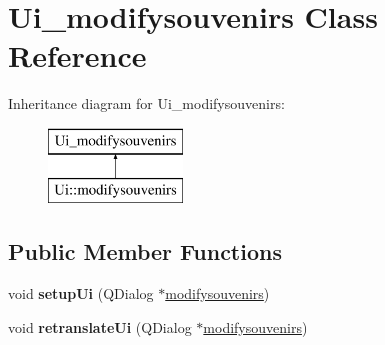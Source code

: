 \hypertarget{class_ui__modifysouvenirs}{}\section{Ui\+\_\+modifysouvenirs Class Reference}
\label{class_ui__modifysouvenirs}
Inheritance diagram for Ui\+\_\+modifysouvenirs\+:\begin{figure}[H]
\begin{center}
\leavevmode
\includegraphics[height=2.000000cm]{class_ui__modifysouvenirs}
\end{center}
\end{figure}
\subsection*{Public Member Functions}
\begin{DoxyCompactItemize}
\item 
\mbox{\label{class_ui__modifysouvenirs_a65a331835a231045990275798a7e8df0}} 
void {\bfseries setup\+Ui} (Q\+Dialog $\ast$\hyperlink{classmodifysouvenirs}{modifysouvenirs})
\item 
\mbox{\label{class_ui__modifysouvenirs_a151a961dcf5b8f9a622d3d53619f8c35}} 
void {\bfseries retranslate\+Ui} (Q\+Dialog $\ast$\hyperlink{classmodifysouvenirs}{modifysouvenirs})
\end{DoxyCompactItemize}
